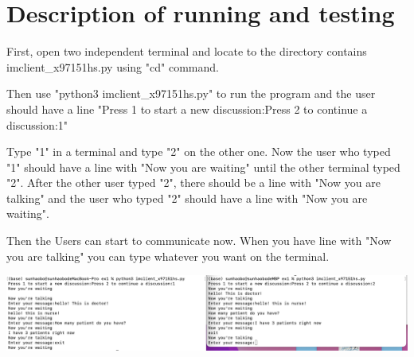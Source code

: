 \documentclass[a4]{article}
\begin{document}
\section{Description of running and testing}

	First, open two independent terminal and locate to the directory contains imclient\_x97151hs.py using "cd" command. 

	Then use "python3 imclient\_x97151hs.py" to run the program and the user should have a line "Press 1 to start a new discussion:Press 2 to continue a discussion:1"

	Type "1" in a terminal and type "2" on the other one. Now the user who typed "1" should have a line with "Now you are waiting" until the other terminal typed "2". After the other user typed "2", there should be a line with "Now you are talking" and the user who typed "2" should have a line with "Now you are waiting".

	Then the Users can start to communicate now. When you have line with "Now you are talking" you can type whatever you want on the terminal.




\includegraphics[scale=0.3]{commands.png}
 


\appendix

\end{document}
